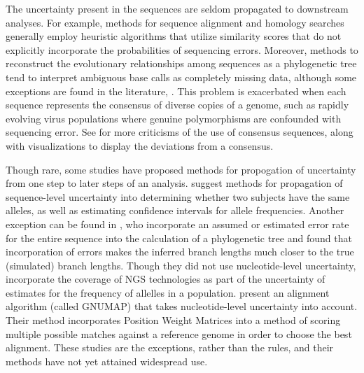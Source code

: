 \documentclass[10pt]{article}
\begin{document}
The uncertainty present in the sequences are seldom propagated to downstream analyses.
For example, methods for sequence alignment and homology searches generally employ heuristic algorithms that utilize similarity scores that do not explicitly incorporate the probabilities of sequencing errors.
Moreover, methods to reconstruct the evolutionary relationships among sequences as a phylogenetic tree tend to interpret ambiguous base calls as completely missing data, although some exceptions are found in the literature, \eg \citet{depristoFrameworkVariationDiscovery2011}.
This problem is exacerbated when each sequence represents the consensus of diverse copies of a genome, such as rapidly evolving virus populations where genuine polymorphisms are confounded with sequencing error. 
See \citet{schneiderConsensusSequenceZen2002} for more criticisms of the use of consensus sequences, along with visualizations \citep[called *sequence logos*, ]{schneiderSequenceLogosNew1990} to display the deviations from a consensus.

Though rare, some studies have proposed methods for propogation of uncertainty from one step to later steps of an analysis.
\citet{oraweAccountingUncertaintyDNA2015} suggest methods for propagation of sequence-level uncertainty into determining whether two subjects have the same alleles, as well as estimating confidence intervals for allele frequencies. 
Another exception can be found in \citet{kuhnerCorrectingSequencingError2014}, who incorporate an assumed or estimated error rate for the entire sequence into the calculation of a phylogenetic tree and found that incorporation of errors makes the inferred branch lengths much closer to the true (simulated) branch lengths.
Though they did not use nucleotide-level uncertainty, \citet{gompertHierarchicalBayesianModel2011} incorporate the coverage of NGS technologies as part of the uncertainty of estimates for the frequency of allelles in a population.
\citet{clementGNUMAPAlgorithmUnbiased2010} present an alignment algorithm (called GNUMAP) that takes nucleotide-level uncertainty into account. 
Their method incorporates Position Weight Matrices into a method of scoring multiple possible matches against a reference genome in order to choose the best alignment. 
These studies are the exceptions, rather than the rules, and their methods have not yet attained widespread use.
\end{document}
